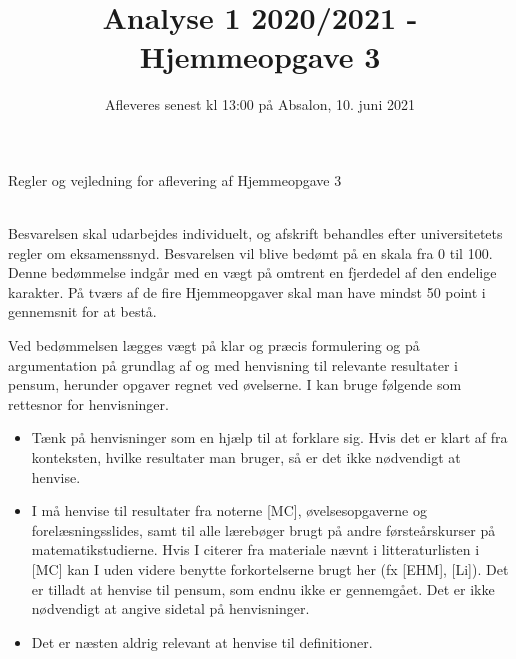 \documentclass{article}
\title{Analyse 1 2020/2021 - Hjemmeopgave 3}
\author{}
\date{\vspace{-1cm}Afleveres senest kl 13:00 på Absalon, 10. juni 2021}
\newif\ifrules
\begin{document}
	
	\maketitle
	
	\noindent
	
	
	
	\ifrules
	\newpage
	\noindent
	{\LARGE Regler og vejledning for aflevering af Hjemmeopgave 3}
	
	\noindent\hrulefill \\
	
	\noindent
	Besvarelsen skal udarbejdes individuelt, og afskrift behandles efter universitetets regler om eksamenssnyd. Besvarelsen vil blive bedømt på en skala fra 0 til 100. Denne bedømmelse indgår med en vægt på omtrent en fjerdedel af den endelige karakter. På tværs af de fire Hjemmeopgaver skal man have mindst 50 point i gennemsnit for at bestå.
	
	Ved bedømmelsen lægges vægt på klar og præcis formulering og på argumentation på grundlag af og med henvisning til relevante resultater i pensum, herunder opgaver regnet ved øvelserne. I kan bruge følgende som rettesnor for henvisninger.
	\begin{itemize}
		\item Tænk på henvisninger som en hjælp til at forklare sig. Hvis det er klart af fra konteksten, hvilke resultater man bruger, så er det ikke nødvendigt at henvise.
		
		\item I må henvise til resultater fra noterne [MC], øvelsesopgaverne og forelæsningsslides, samt til alle l\ae{}reb\o{}ger brugt p\aa{} andre f\o{}rste\aa{}rskurser p\aa{} matematikstudierne. Hvis I citerer fra materiale n\ae{}vnt i litteraturlisten i [MC] kan I uden videre benytte forkortelserne brugt her (fx [EHM], [Li]). Det er tilladt at henvise til pensum, som endnu ikke er gennemgået. Det er ikke nødvendigt at angive sidetal på henvisninger. 
		
		\item Det er næsten aldrig relevant at henvise til definitioner.
	\end{itemize}
	
	
\end{document}
